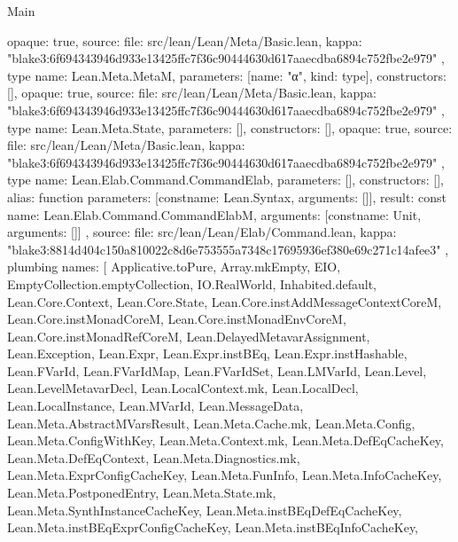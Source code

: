 \begin{lexlean}{Main}
\begin{toolingmodule}
{{      opaque: true,
      source: {
        file: src/lean/Lean/Meta/Basic.lean,
        kappa: "blake3:6f694343946d933e13425ffc7f36c90444630d617aaecdba6894c752fbe2e979"
      }
    },
    type{
      name: Lean.Meta.MetaM,
      parameters: [{name: "α", kind: type{}}],
      constructors: [],
      opaque: true,
      source: {
        file: src/lean/Lean/Meta/Basic.lean,
        kappa: "blake3:6f694343946d933e13425ffc7f36c90444630d617aaecdba6894c752fbe2e979"
      }
    },
    type{
      name: Lean.Meta.State,
      parameters: [],
      constructors: [],
      opaque: true,
      source: {
        file: src/lean/Lean/Meta/Basic.lean,
        kappa: "blake3:6f694343946d933e13425ffc7f36c90444630d617aaecdba6894c752fbe2e979"
      }
    },
    type{
      name: Lean.Elab.Command.CommandElab,
      parameters: [],
      constructors: [],
      alias: function{
        parameters: [const{name: Lean.Syntax, arguments: []}],
        result: const{
          name: Lean.Elab.Command.CommandElabM,
          arguments: [const{name: Unit, arguments: []}]
        }
      },
      source: {
        file: src/lean/Lean/Elab/Command.lean,
        kappa: "blake3:8814d404c150a810022c8d6e753555a7348c17695936ef380e69c271c14afee3"
      }
    },
    plumbing{
      names: [
        Applicative.toPure,
        Array.mkEmpty,
        EIO,
        EmptyCollection.emptyCollection,
        IO.RealWorld,
        Inhabited.default,
        Lean.Core.Context,
        Lean.Core.State,
        Lean.Core.instAddMessageContextCoreM,
        Lean.Core.instMonadCoreM,
        Lean.Core.instMonadEnvCoreM,
        Lean.Core.instMonadRefCoreM,
        Lean.DelayedMetavarAssignment,
        Lean.Exception,
        Lean.Expr,
        Lean.Expr.instBEq,
        Lean.Expr.instHashable,
        Lean.FVarId,
        Lean.FVarIdMap,
        Lean.FVarIdSet,
        Lean.LMVarId,
        Lean.Level,
        Lean.LevelMetavarDecl,
        Lean.LocalContext.mk,
        Lean.LocalDecl,
        Lean.LocalInstance,
        Lean.MVarId,
        Lean.MessageData,
        Lean.Meta.AbstractMVarsResult,
        Lean.Meta.Cache.mk,
        Lean.Meta.Config,
        Lean.Meta.ConfigWithKey,
        Lean.Meta.Context.mk,
        Lean.Meta.DefEqCacheKey,
        Lean.Meta.DefEqContext,
        Lean.Meta.Diagnostics.mk,
        Lean.Meta.ExprConfigCacheKey,
        Lean.Meta.FunInfo,
        Lean.Meta.InfoCacheKey,
        Lean.Meta.PostponedEntry,
        Lean.Meta.State.mk,
        Lean.Meta.SynthInstanceCacheKey,
        Lean.Meta.instBEqDefEqCacheKey,
        Lean.Meta.instBEqExprConfigCacheKey,
        Lean.Meta.instBEqInfoCacheKey,
}}
\end{toolingmodule}
\end{lexlean}
